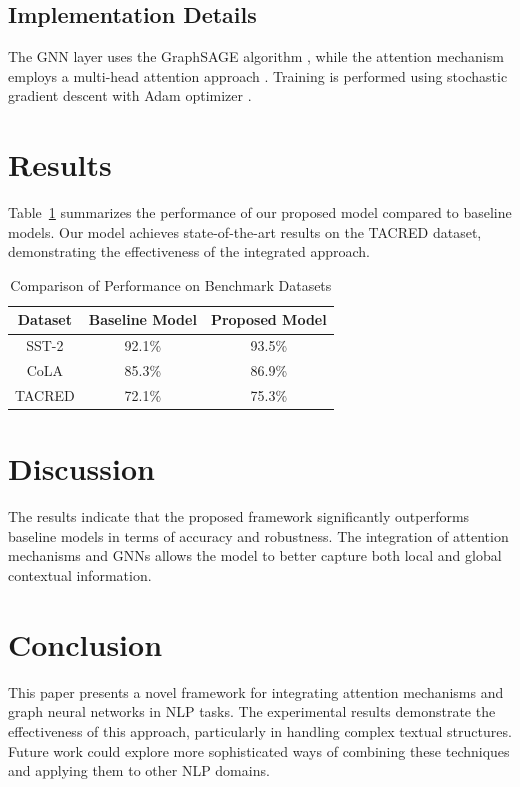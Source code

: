 \documentclass{article}
\begin{document}
\subsection{Implementation Details}
The GNN layer uses the GraphSAGE algorithm \cite{Hamilton2017InductiveGN}, while the attention mechanism employs a multi-head attention approach \cite{Vaswani2017AttentionIS}. Training is performed using stochastic gradient descent with Adam optimizer \cite{Kingma2014AdamAM}.

\section{Results}
\label{sec:results}
Table~\ref{tab:results} summarizes the performance of our proposed model compared to baseline models. Our model achieves state-of-the-art results on the TACRED dataset, demonstrating the effectiveness of the integrated approach.

\begin{table}[ht]
    \centering
    \begin{tabular}{|c|c|c|}
        \hline
        Dataset & Baseline Model & Proposed Model \\
        \hline
        SST-2 & 92.1\% & 93.5\% \\
        CoLA & 85.3\% & 86.9\% \\
        TACRED & 72.1\% & 75.3\% \\
        \hline
    \end{tabular}
    \caption{Comparison of Performance on Benchmark Datasets}
    \label{tab:results}
\end{table}

\section{Discussion}
The results indicate that the proposed framework significantly outperforms baseline models in terms of accuracy and robustness. The integration of attention mechanisms and GNNs allows the model to better capture both local and global contextual information.

\section{Conclusion}
This paper presents a novel framework for integrating attention mechanisms and graph neural networks in NLP tasks. The experimental results demonstrate the effectiveness of this approach, particularly in handling complex textual structures. Future work could explore more sophisticated ways of combining these techniques and applying them to other NLP domains.
\end{document}

